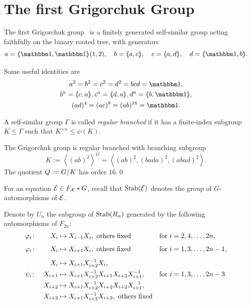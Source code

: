 \documentclass[a4paper,11pt]{amsart}
\begin{document}
\section{The first Grigorchuk Group}\label{sec:GrigorchukGroup}
The first Grigorchuk group~\cite{Grigorchuk:Burnside} is a finitely
generated self-similar group acting faithfully on the binary rooted
tree, with generators
\[a=\pair{\id,\id}(1,2),\quad b=\pair{a,c},\quad c=\pair{a,d},\quad d=\pair{\id,b}. \]

Some useful identities are
\begin{gather*}
  a^2=b^2=c^2=d^2=bcd=\id,\\
  b^a= \pair{c,a}, c^a=\pair{d,a}, d^a=\pair{b,\id},\\
  (ad)^4=(ac)^8=(ab)^{16}= \id.
\end{gather*}
\begin{defi}
 A self-similar group $\Gamma$ is called \emph{regular branched} if it
 has a finite-index subgroup $K\leq \Gamma$ such that $K^{\times n} \leq \psi(K)$.
\end{defi}
\begin{lem}\label{lem:subgroupK}
The Grigorchuk group is regular branched with branching subgroup 
 \[K:= \left<(ab)^2\right>^G=\left< (ab)^2,(bada)^2,(abad)^2 \right>. \]
 The quotient $Q := {G/K}$ has order $16$.\qed
\end{lem}

For an equation $\mathcal{E}\in F_{\mathcal X}*G$, recall that
$\operatorname{Stab}(\mathcal{E})$ denotes the group of $G$-automorphisms of $\mathcal{E}$.

Denote by $U_n$ the subgroup of $\operatorname{Stab}(R_n)$ generated by the
following automorphisms of $F_{2n}$:
 \begin{align*}
   \varphi_i&\colon& X_i&\mapsto X_{i-1}X_i, \textup{ others fixed} & \textup{for }&i=2,4,\dotsc,2n,\\[1ex]
   \varphi_i&\colon&X_i&\mapsto X_{i+1}X_i, \textup{ others fixed} & \textup{for }&i=1,3,\dotsc,2n-1,\\[1ex]
   && X_i&\mapsto X_{i+1}X_{i+2}^{-1}X_i,\\
   \psi_i&\colon & X_{i+1}&\mapsto X_{i+1}X_{i+2}^{-1}X_{i+1}X_{i+2}X_{i+1}^{-1}, & \textup{for }&i=1,3,\dotsc,2n-3\\
   && X_{i+2}&\mapsto X_{i+1}X_{i+2}^{-1}X_{i+2}X_{i+2}X_{i+1}^{-1},\\
   && X_{i+3}&\mapsto X_{i+1}X_{i+2}^{-1}X_{i+3}, \textup{ others fixed}
\end{align*}
\end{document}
